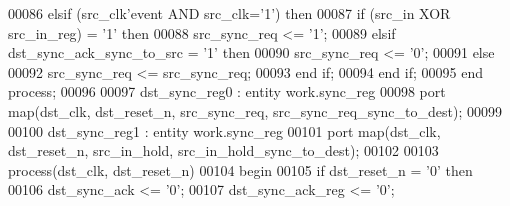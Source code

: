\begin{DoxyCode}
00086    \textcolor{keywordflow}{elsif} \textcolor{vhdlchar}{(}\textcolor{vhdlchar}{src_clk}\textcolor{vhdlchar}{'}\textcolor{vhdlkeyword}{event} \textcolor{keywordflow}{AND} \textcolor{vhdlchar}{src_clk}\textcolor{vhdlchar}{=}\textcolor{vhdlchar}{'}\textcolor{vhdllogic}{}\textcolor{vhdllogic}{1}\textcolor{vhdlchar}{'}\textcolor{vhdlchar}{)} \textcolor{keywordflow}{then}
00087       \textcolor{keywordflow}{if} \textcolor{vhdlchar}{(}\textcolor{vhdlchar}{src_in} \textcolor{keywordflow}{XOR} \textcolor{vhdlchar}{src_in_reg}\textcolor{vhdlchar}{)} \textcolor{vhdlchar}{=} \textcolor{vhdlchar}{'}\textcolor{vhdllogic}{}\textcolor{vhdllogic}{1}\textcolor{vhdlchar}{'} \textcolor{keywordflow}{then} 
00088          \textcolor{vhdlchar}{src_sync_req} \textcolor{vhdlchar}{<=} \textcolor{vhdlchar}{'}\textcolor{vhdllogic}{}\textcolor{vhdllogic}{1}\textcolor{vhdlchar}{'};
00089       \textcolor{keywordflow}{elsif} \textcolor{vhdlchar}{dst_sync_ack_sync_to_src} \textcolor{vhdlchar}{=} \textcolor{vhdlchar}{'}\textcolor{vhdllogic}{}\textcolor{vhdllogic}{1}\textcolor{vhdlchar}{'} \textcolor{keywordflow}{then} 
00090          \textcolor{vhdlchar}{src_sync_req} \textcolor{vhdlchar}{<=} \textcolor{vhdlchar}{'}\textcolor{vhdllogic}{}\textcolor{vhdllogic}{0}\textcolor{vhdlchar}{'};
00091       \textcolor{keywordflow}{else}
00092          \textcolor{vhdlchar}{src_sync_req} \textcolor{vhdlchar}{<=} \textcolor{vhdlchar}{src_sync_req};
00093       \textcolor{keywordflow}{end} \textcolor{keywordflow}{if};
00094    \textcolor{keywordflow}{end} \textcolor{keywordflow}{if};
00095 \textcolor{keywordflow}{end} \textcolor{keywordflow}{process};
00096 
00097 dst\_sync\_reg0 : \textcolor{keywordflow}{entity} work.sync_reg 
00098 \textcolor{keywordflow}{port} \textcolor{keywordflow}{map}(dst_clk, dst_reset_n, src_sync_req, src_sync_req_sync_to_dest\textcolor{vhdlchar}{)};
00099 
00100 dst\_sync\_reg1 : \textcolor{keywordflow}{entity} work.sync_reg 
00101 \textcolor{keywordflow}{port} \textcolor{keywordflow}{map}(dst_clk, dst_reset_n, src_in_hold, src_in_hold_sync_to_dest\textcolor{vhdlchar}{)};
00102 
00103 \textcolor{keywordflow}{process}(dst_clk, dst_reset_n)
00104 \textcolor{vhdlkeyword}{begin}
00105    \textcolor{keywordflow}{if} \textcolor{vhdlchar}{dst_reset_n} \textcolor{vhdlchar}{=} \textcolor{vhdlchar}{'}\textcolor{vhdllogic}{}\textcolor{vhdllogic}{0}\textcolor{vhdlchar}{'} \textcolor{keywordflow}{then} 
00106       \textcolor{vhdlchar}{dst_sync_ack}      \textcolor{vhdlchar}{<=} \textcolor{vhdlchar}{'}\textcolor{vhdllogic}{}\textcolor{vhdllogic}{0}\textcolor{vhdlchar}{'};
00107       \textcolor{vhdlchar}{dst_sync_ack_reg}  \textcolor{vhdlchar}{<=} \textcolor{vhdlchar}{'}\textcolor{vhdllogic}{}\textcolor{vhdllogic}{0}\textcolor{vhdlchar}{'};

\end{DoxyCode}
